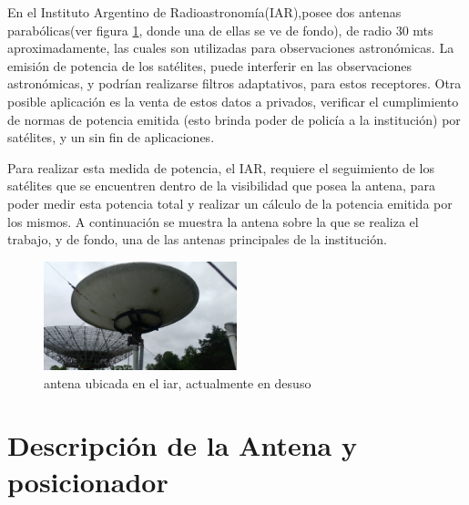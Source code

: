 En el Instituto Argentino de Radioastronomía(IAR),posee dos antenas parabólicas(ver figura \ref{fig_antena}, donde una de ellas se ve de fondo), de radio 30 mts aproximadamente, las cuales son utilizadas para observaciones astronómicas. La emisión de potencia de los satélites, puede interferir en las observaciones astronómicas, y podrían realizarse filtros adaptativos, para estos receptores. Otra posible aplicación es la venta de estos datos a privados, verificar el cumplimiento de normas de potencia emitida (esto brinda poder de policía a la institución) por satélites, y un sin fin de aplicaciones. 

Para realizar esta medida de potencia, el IAR, requiere el seguimiento de los satélites que se encuentren dentro de la visibilidad que posea la antena, para poder medir esta potencia total y realizar un cálculo de la potencia emitida por los mismos. A continuación se muestra la antena sobre la que se realiza el trabajo, y de fondo, una de las antenas principales de la institución.   

\begin{figure}[h]
	\centering 
	\includegraphics[width=0.5\textwidth]{parte_1/cap1/antena}
	\caption{antena ubicada en el iar, actualmente en desuso}
	\label{fig_antena}
\end{figure}

\section{Descripción de la Antena y posicionador }

